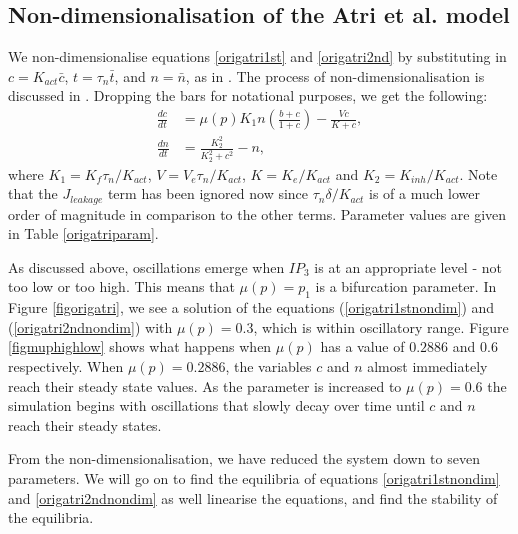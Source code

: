 \subsection{Non-dimensionalisation of the Atri et al. model}
We non-dimensionalise equations \eqref{origatri1st} and \eqref{origatri2nd} by substituting in $c=K_{act}\bar{c}$, $t=\tau_n\bar{t}$, and $n=\bar{n}$, as in . The process of non-dimensionalisation is discussed in . Dropping the bars for notational purposes, we get the following:
\begin{align}
    \frac{dc}{dt}&=\mu(p)K_1n\left(\frac{b+c}{1+c}\right)-\frac{Vc}{K+c},\label{origatri1stnondim}\\
    \frac{dn}{dt}&=\frac{K_2^2}{K_2^2+c^2}-n,\label{origatri2ndnondim}
\end{align}
where $K_1={K_{f}\tau_n}/{K_{act}}$, $V={V_e\tau_n}/{K_{act}}$, $K={K_e}/{K_{act}}$ and $K_2={K_{inh}}/{K_{act}}$. {Note that the $J_{leakage}$ term has been ignored now since ${\tau_n\delta}/{K_{act}}$ is of a much lower order of magnitude in comparison to the other terms. Parameter values are given in Table \ref{origatriparam}.}

As discussed above, oscillations emerge when $IP_3$ is at an appropriate level - not too low or too high. This means that $\mu(p)=p_1$ is a bifurcation parameter. In Figure \ref{figorigatri}, we see a solution of the equations (\ref{origatri1stnondim}) and (\ref{origatri2ndnondim}) with $\mu(p)=0.3$, which is within oscillatory range.  Figure \ref{figmuphighlow} shows what happens when $\mu(p)$ has a value of $0.2886$ and $0.6$ respectively. When $\mu(p)=0.2886$, the variables $c$ and $n$ almost immediately reach their steady state values. As the parameter is increased to $\mu(p)=0.6$ the simulation  begins with oscillations that slowly decay over time until $c$ and $n$ reach their steady states.

From the non-dimensionalisation, we have reduced the system down to seven parameters. We will go on to find the equilibria of equations \eqref{origatri1stnondim} and \eqref{origatri2ndnondim} as well linearise the equations, and find the stability of the equilibria.

